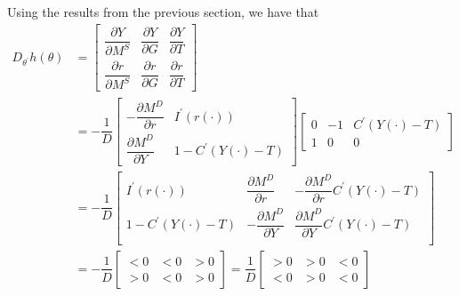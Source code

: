 \documentclass{article}
\begin{document}
\begin{enumerate}[1.]
\begin{enumerate}[a)]
        \solution Using the results from the previous section, we have that
        \begin{align*}
          D_{\theta^\prime} h(\theta)
          & =
          \left[\begin{matrix}
              \dfrac{\partial Y}{\partial M^S}
            & \dfrac{\partial Y}{\partial G}
            & \dfrac{\partial Y}{\partial T} \\[6pt]
              \dfrac{\partial r}{\partial M^S}
            & \dfrac{\partial r}{\partial G}
            & \dfrac{\partial r}{\partial T}
          \end{matrix}\right]
          \\[6pt]
          & =
            -\dfrac{1}{D}
            \left[\begin{matrix}
                - \dfrac{\partial M^D}{\partial r}
              & I^\prime(r(\cdot)) \\[6pt]
                \dfrac{\partial M^D}{\partial Y}
              & 1 - C^\prime(Y(\cdot) - T)
            \end{matrix}\right]
            \left[\begin{matrix}
                0
              & -1
              & C^\prime(Y(\cdot) - T) \\[6pt]
                1
              & 0
              & 0
            \end{matrix}\right]
          \\[6pt]
          & =
          - \dfrac{1}{D}
          \left[\begin{matrix}
                I^\prime(r(\cdot))
            &   \dfrac{\partial M^D}{\partial r}
            & - \dfrac{\partial M^D}{\partial r} C^\prime(Y(\cdot) - T)
            \\[6pt]
                1 - C^\prime(Y(\cdot) - T)
            & - \dfrac{\partial M^D}{\partial Y}
            &   \dfrac{\partial M^D}{\partial Y} C^\prime(Y(\cdot) - T)
            \\[6pt]
          \end{matrix}\right] \\
          & =
          - \dfrac{1}{D}
          \left[\begin{matrix}
              < 0
            & < 0
            & > 0 \\[6pt]
              > 0
            & < 0
            & > 0
          \end{matrix}\right]
          =
          \dfrac{1}{D}
          \left[\begin{matrix}
              > 0
            & > 0
            & < 0 \\[6pt]
              < 0
            & > 0
            & < 0
          \end{matrix}\right]
        \end{align*}


\end{enumerate}
\end{enumerate}
\end{document}
